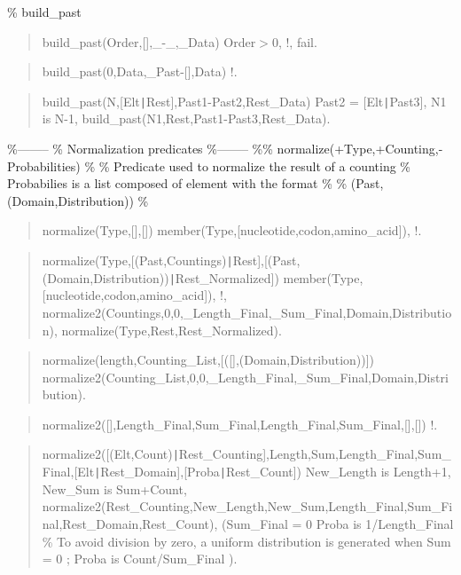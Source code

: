 \% build_past

\begin{quote}
build_past(Order,[],_-_,_Data) \Sneck{}
Order$>$0,
!,
fail.
\end{quote}

\begin{quote}
build_past(0,Data,_Past-[],Data) \Sneck{}
!.
\end{quote}

\begin{quote}
build_past(N,[Elt{\tt\string|}Rest],Past1-Past2,Rest_Data) \Sneck{}
Past2 = [Elt{\tt\string|}Past3],
N1 is N-1,
build_past(N1,Rest,Past1-Past3,Rest_Data).
\end{quote}

\%--------
\% Normalization predicates
\%--------
\%\% normalize(+Type,+Counting,-Probabilities)
\%
\% Predicate used to normalize the result of a counting
\% Probabilies is a list composed of element with the format
\% \Sequal{}
\% (Past,(Domain,Distribution))
\% \Sequal{}

\begin{quote}
normalize(Type,[],[]) \Sneck{}
member(Type,[nucleotide,codon,amino_acid]),
!.
\end{quote}

\begin{quote}
normalize(Type,[(Past,Countings){\tt\string|}Rest],[(Past,(Domain,Distribution)){\tt\string|}Rest_Normalized]) \Sneck{}
member(Type,[nucleotide,codon,amino_acid]),
!,
normalize2(Countings,0,0,_Length_Final,_Sum_Final,Domain,Distribution),
normalize(Type,Rest,Rest_Normalized).
\end{quote}

\begin{quote}
normalize(length,Counting_List,[([],(Domain,Distribution))]) \Sneck{}
normalize2(Counting_List,0,0,_Length_Final,_Sum_Final,Domain,Distribution).
\end{quote}

\begin{quote}
normalize2([],Length_Final,Sum_Final,Length_Final,Sum_Final,[],[]) \Sneck{}
!.
\end{quote}

\begin{quote}
normalize2([(Elt,Count){\tt\string|}Rest_Counting],Length,Sum,Length_Final,Sum_Final,[Elt{\tt\string|}Rest_Domain],[Proba{\tt\string|}Rest_Count]) \Sneck{}
New_Length is Length+1,
New_Sum is Sum+Count,
normalize2(Rest_Counting,New_Length,New_Sum,Length_Final,Sum_Final,Rest_Domain,Rest_Count),
(Sum_Final = 0 \Sifthen{}
Proba is 1/Length_Final \% To avoid division by zero, a uniform distribution is generated when Sum = 0
;
Proba is Count/Sum_Final
).
\end{quote}

